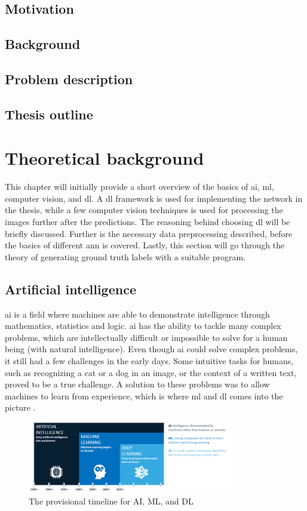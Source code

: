 \documentclass[USenglish]{ifimaster}  %
\begin{document}
\section{Motivation}
\section{Background}
\section{Problem description}
\section{Thesis outline}

\chapter{Theoretical background}
This chapter will initially provide a short overview of the basics of \ac{ai}, \ac{ml}, computer vision, and \acf{dl}. A \ac{dl} framework is used for implementing the network in the thesis, while a few computer vision techniques is used for processing the images further after the predictions. The reasoning behind choosing \ac{dl} will be briefly discussed. Further is the necessary data preprocessing described, before the basics of different \ac{ann} is covered. Lastly, this section will go through the theory of generating ground truth labels with a suitable program.

\section{Artificial intelligence}
\ac{ai} is a field where machines are able to demonstrate intelligence through mathematics, statistics and logic. \ac{ai} has the ability to tackle many complex problems, which are intellectually difficult or impossible to solve for a human being (with natural intelligence). Even though \ac{ai} could solve complex problems, it still had a few challenges in the early days. Some intuitive tasks for humans, such as recognizing a cat or a dog in an image, or the context of a written text, proved to be a true challenge. A solution to these problems was to allow machines to learn from experience, which is where \ac{ml} and \ac{dl} comes into the picture \cite{The_holy_grail_of_DL}.

\begin{figure}[H]
    \centering
    \includegraphics[width=0.8\textwidth]{bilder/AI_ML_DL.png}
    \caption{The provisional timeline for AI, ML, and DL \cite{website:AI}}
    \label{fig:AI}
\end{figure}
\end{document}

